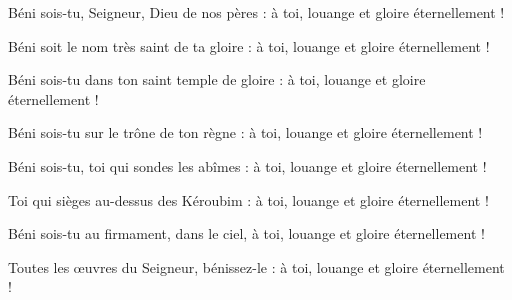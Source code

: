 \item Béni sois-tu, Seigneur, Dieu de nos pères :
à toi, louange et gloire éternellement !

\item Béni soit le nom très saint de ta gloire :
à toi, louange et gloire éternellement !

\item Béni sois-tu dans ton saint temple de gloire :
à toi, louange et gloire éternellement !

\item Béni sois-tu sur le trône de ton règne :
à toi, louange et gloire éternellement !

\item Béni sois-tu, toi qui sondes les abîmes :
à toi, louange et gloire éternellement !

\item Toi qui sièges au-dessus des Kéroubim :
à toi, louange et gloire éternellement !

\item Béni sois-tu au firmament, dans le ciel,
à toi, louange et gloire éternellement !

\item Toutes les œuvres du Seigneur, bénissez-le :
à toi, louange et gloire éternellement !